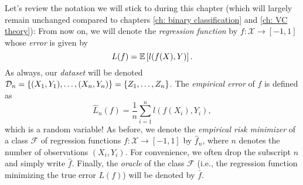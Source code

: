 Let's review the notation we will stick to during this chapter (which will largely remain unchanged compared to chapters \ref{ch: binary classification} and \ref{ch: VC theory}): From now on, we will denote the \emph{regression function} by $f \colon \mathcal{X} \to [-1, 1]$ whose \emph{error} is given by
\[
    L(f) = \mathbb{E}\left[l(f(X), Y)\right].
\]
As always, our \emph{dataset} will be denoted $\mathcal{D}_n = \left\{(X_1, Y_1), \dots, (X_n, Y_n)\right\} = \left\{Z_1, \dots, Z_n\right\}$. The \emph{empirical error} of $f$ is defined as
\[
    \hat L_n(f) = \frac{1}{n} \sum_{i=1}^n l(f(X_i), Y_i),
\]
which is a random variable! As before, we denote the \emph{empirical risk minimizer} of a class $\mathcal{F}$ of regression functions $f \colon \mathcal{X} \to [-1, 1]$ by $\hat f_n$, where $n$ denotes the number of observations $(X_i, Y_i)$. For convenience, we often drop the subscript $n$ and simply write $\hat f$. Finally, the \emph{oracle} of the class $\mathcal{F}$ (i.e., the regression function minimizing the true error $L(f)$) will be denoted by $\bar f$.
